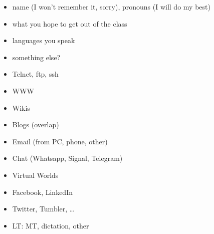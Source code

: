\documentclass[a4paper,landscape,headrule,footrule,xetex]{foils}
\begin{document}












\begin{itemize}
\item name  (I won't remember it, sorry), pronouns (I will do my best)
\item what you hope to get out of the class
\item languages you speak
\item something else?
\end{itemize}


\begin{itemize} \addtolength{\itemsep}{-0.5ex}
\item Telnet, ftp, ssh
\item WWW
\item Wikis
\item Blogs (overlap)
\item Email (from PC, phone, other)
\item Chat (Whatsapp, Signal, Telegram)
\item Virtual Worlds
\item Facebook, LinkedIn
\item Twitter, Tumbler, \ldots
\item LT: MT, dictation, other
\end{itemize}


\end{document}
